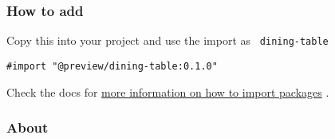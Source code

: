 \subsubsection{How to add}\label{how-to-add}

Copy this into your project and use the import as
\texttt{\ dining-table\ }

\begin{verbatim}
#import "@preview/dining-table:0.1.0"
\end{verbatim}



Check the docs for
\href{https://typst.app/docs/reference/scripting/\#packages}{more
information on how to import packages} .

\subsubsection{About}\label{about}


